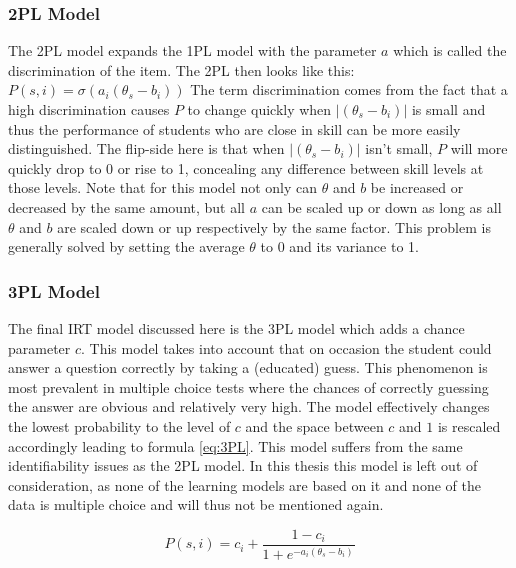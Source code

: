 \documentclass{scrartcl}
\begin{document}
\subsubsection{2PL Model}
The 2PL model expands the 1PL model with the parameter $a$ which is called the discrimination of the item. The 2PL then looks like this: $P(s,i) = \sigma(a_{i} (\theta_{s} - b_{i}))$ The term discrimination comes from the fact that a high discrimination causes $P$ to change quickly when $|(\theta_{s} - b_{i})|$ is small and thus the performance of students who are close in skill can be more easily distinguished. The flip-side here is that when $|(\theta_{s} - b_{i})|$ isn't small, $P$ will more quickly drop to 0 or rise to 1, concealing any difference between skill levels at those levels. Note that for this model not only can $\theta$ and $b$ be increased or decreased by the same amount, but all $a$ can be scaled up or down as long as all $\theta$ and $b$ are scaled down or up respectively by the same factor. This problem is generally solved by setting the average $\theta$ to 0 and its variance to 1. 

\subsubsection{3PL Model}
The final IRT model discussed here is the 3PL model which adds a chance parameter $c$. This model takes into account that on occasion the student could answer a question correctly by taking a (educated) guess. This phenomenon is most prevalent in multiple choice tests where the chances of correctly guessing the answer are obvious and relatively very high. The model effectively changes the lowest probability to the level of $c$ and the space between $c$ and $1$ is rescaled accordingly leading to formula \ref{eq:3PL}. This model suffers from the same identifiability issues as the 2PL model. In this thesis this model is left out of consideration, as none of the learning models are based on it and none of the data is multiple choice and will thus not be mentioned again. 

\begin{equation}
\label{eq:3PL}
P(s,i)= c_{i} + \frac{1-c_{i}}{1+e^{-a_{i}(\theta_{s} - b_{i})}}
\end{equation}
\end{document}
